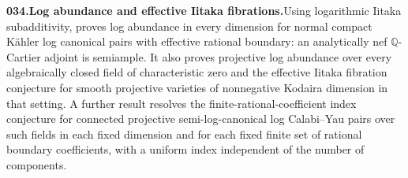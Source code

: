 \documentclass[11pt,a4paper]{article}
\begin{document}
  \par \begin{minipage}{\linewidth}
  \fontsize{10.5}{12.6}\selectfont\RaggedRight
  \hypertarget{result 034}{}
  {\bfseries\textcolor{muted}{034.}\enspace Log abundance and effective Iitaka fibrations.}\enspace Using logarithmic Iitaka subadditivity, proves log abundance in every dimension for normal compact K\"ahler log canonical pairs with effective rational boundary: an analytically nef $\mathbb Q$-Cartier adjoint is semiample. It also proves projective log abundance over every algebraically closed field of characteristic zero and the effective Iitaka fibration conjecture for smooth projective varieties of nonnegative Kodaira dimension in that setting. A further result resolves the finite-rational-coefficient index conjecture for connected projective semi-log-canonical log Calabi--Yau pairs over such fields in each fixed dimension and for each fixed finite set of rational boundary coefficients, with a uniform index independent of the number of components.\par

\end{minipage}
\end{document}
